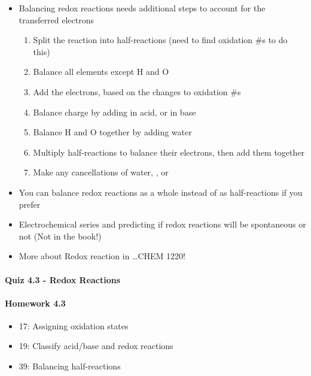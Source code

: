 \documentclass[12pt, openany, letterpaper]{memoir}
\begin{document}
\begin{itemize}
\begin{itemize}
\begin{itemize}
        \end{itemize}
      \item Balancing redox reactions needs additional steps to account for the transferred electrons
        \begin{enumerate}
          \item Split the reaction into half-reactions (need to find oxidation \#s to do this)
          \item Balance all elements except H and O
          \item Add the electrons, based on the changes to oxidation \#s
          \item Balance charge by adding  in acid, or  in base
          \item Balance H and O together by adding water
          \item Multiply half-reactions to balance their electrons, then add them together
          \item Make any cancellations of water, , or 
        \end{enumerate}
      \item You can balance redox reactions as a whole instead of as half-reactions if you prefer
      \item Electrochemical series and predicting if redox reactions will be spontaneous or not (Not in the book!)
      \item More about Redox reaction in \ldots CHEM 1220!
    \end{itemize}
\end{itemize}

\paragraph*{Quiz 4.3 - Redox Reactions}
\paragraph*{Homework 4.3}
\begin{itemize}
  \item 17: Assigning oxidation states
  \item 19: Classify acid/base and redox reactions
  \item 39: Balancing half-reactions
\end{itemize}
\end{document}

